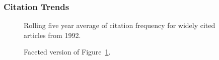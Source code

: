\documentclass[
  10pt,
  letterpaper,
  DIV=11,
  numbers=noendperiod,
  twoside]{scrartcl}
\begin{document}
\subsubsection*{Citation Trends}\label{citation-trends-16}

\begin{figure}


\caption{\label{fig-citation-spaghetti-1992}Rolling five year average of
citation frequency for widely cited articles from 1992.}

\end{figure}%

\begin{figure}


\caption{\label{fig-citation-facet-1992}Faceted version of
Figure~\ref{fig-citation-spaghetti-1992}.}

\end{figure}%
\end{document}
